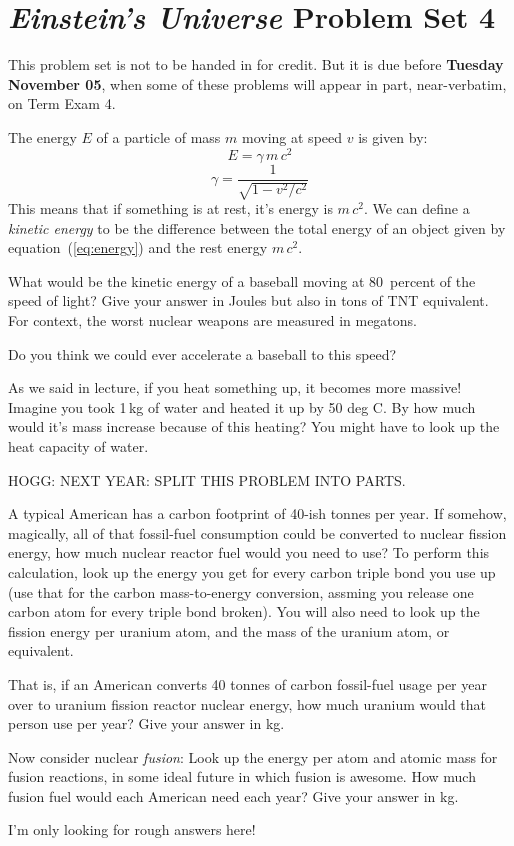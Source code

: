 \documentclass[12pt, letterpaper]{article}
\begin{document}
\section*{\textsl{Einstein's Universe} Problem Set 4}

This problem set is not to be handed in for credit. But it is due
before \textbf{Tuesday November 05}, when some of these problems
will appear in part, near-verbatim, on Term Exam 4.

\begin{problem}
The energy $E$ of a particle of mass $m$ moving
at speed $v$ is given by:
\begin{equation}\label{eq:energy}
E = \gamma\,m\,c^2
\end{equation}
\begin{equation}
\gamma = \frac{1}{\sqrt{1 - v^2/c^2}}
\end{equation}
This means that if something is at rest, it's energy is $m\,c^2$.
We can define a \emph{kinetic energy} to be the difference
between the total energy of an object given by
equation~(\ref{eq:energy}) and the rest energy $m\,c^2$.

What would be the kinetic energy of a baseball moving at 80~percent of the
speed of light? Give your answer in Joules but also in tons of TNT
equivalent. For context, the worst nuclear weapons are measured in
megatons.

Do you think we could ever accelerate a baseball to this speed?
\end{problem}

\begin{problem}
As we said in lecture, if you heat something up, it becomes more
massive! Imagine you took 1\,kg of water and heated it up by 50 deg
C. By how much would it's mass increase because of this heating?
You might have to look up the heat capacity of water.
\end{problem}

\begin{problem}
HOGG: NEXT YEAR: SPLIT THIS PROBLEM INTO PARTS.

A typical American has a carbon footprint of 40-ish tonnes per year.
If somehow, magically, all of that fossil-fuel consumption could be
converted to nuclear fission energy, how much nuclear reactor fuel
would you need to use? To perform this calculation, look up the energy you
get for every carbon triple bond you use up (use that for the carbon
mass-to-energy conversion, assming you release one carbon atom for
every triple bond broken). You will also need to look up the fission energy
per uranium atom, and the mass of the uranium atom, or equivalent.

That is, if an American converts 40 tonnes of carbon fossil-fuel usage
per year over to uranium fission reactor nuclear energy, how much
uranium would that person use per year? Give your answer in kg.

Now consider nuclear \emph{fusion}: Look up the energy per atom and atomic
mass for fusion reactions, in some ideal future in which fusion is awesome.
How much fusion fuel would each American need each year? Give your answer
in kg.

I'm only looking for rough answers here!
\end{problem}
\end{document}
